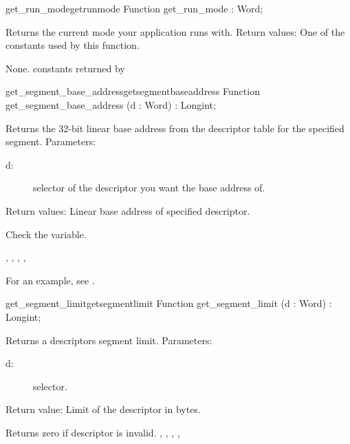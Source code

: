 \begin{functionl}{get\_run\_mode}{getrunmode}
\Declaration
Function get\_run\_mode  : Word;

\Description
Returns the current mode your application runs with.
Return values: One of the constants used by this function.

\Errors
None. 
\SeeAlso
 constants returned by   
\end{functionl}
\begin{functionl}{get\_segment\_base\_address}{getsegmentbaseaddress}
\Declaration
Function get\_segment\_base\_address  
(d : Word) : Longint;

\Description
 Returns the 32-bit linear base address from the descriptor table for the
specified segment.
Parameters: 
\begin{description}
\item[d:\ ] selector of the descriptor you want the base address of.
\end{description}
Return values: Linear base address of specified descriptor.

\Errors
 Check the  variable.
\SeeAlso

,
, 
,
,

\end{functionl}
For an example, see 
.
\begin{functionl}{get\_segment\_limit}{getsegmentlimit}
\Declaration
Function get\_segment\_limit (d : Word) : Longint;

\Description
Returns a descriptors segment limit.
Parameters:
\begin{description}
\item [d:\ ] selector.
\end{description}
Return value: Limit of the descriptor in bytes.

\Errors
 Returns zero if descriptor is invalid. 
\SeeAlso
{},
, 
,
, 

\end{functionl}
